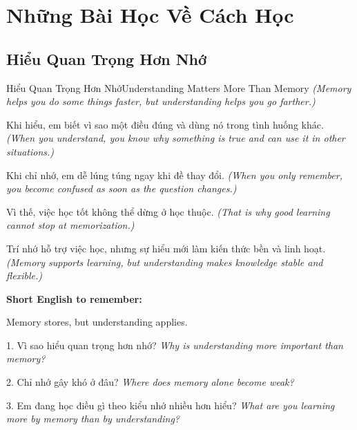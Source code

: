 \chapter{Những Bài Học Về Cách Học}

\section{Hiểu Quan Trọng Hơn Nhớ}
\begin{truyen}{Hiểu Quan Trọng Hơn Nhớ}{Understanding Matters More Than Memory}
\textit{(Memory helps you do some things faster, but understanding helps you go farther.)}

Khi hiểu, em biết vì sao một điều đúng và dùng nó trong tình huống khác.
\textit{(When you understand, you know why something is true and can use it in other situations.)}

Khi chỉ nhớ, em dễ lúng túng ngay khi đề thay đổi.
\textit{(When you only remember, you become confused as soon as the question changes.)}

Vì thế, việc học tốt không thể dừng ở học thuộc.
\textit{(That is why good learning cannot stop at memorization.)}
\end{truyen}

\begin{baihoc}
Trí nhớ hỗ trợ việc học, nhưng sự hiểu mới làm kiến thức bền và linh hoạt.
\textit{(Memory supports learning, but understanding makes knowledge stable and flexible.)}
\end{baihoc}

\begin{ghinhoanh}
\textbf{Short English to remember:}

Memory stores, but understanding applies.

\end{ghinhoanh}

\begin{tuhocnhanh}
1. Vì sao hiểu quan trọng hơn nhớ? \textit{Why is understanding more important than memory?}

2. Chỉ nhớ gây khó ở đâu? \textit{Where does memory alone become weak?}

3. Em đang học điều gì theo kiểu nhớ nhiều hơn hiểu? \textit{What are you learning more by memory than by understanding?}
\end{tuhocnhanh}
\ngancach

